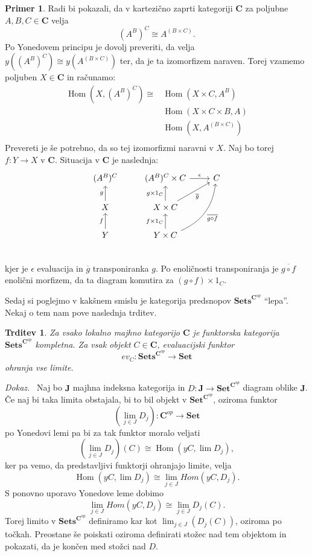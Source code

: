 \documentclass[12pt,a4paper]{book}
\theoremstyle{definition}
\theoremstyle{plain}
\newtheorem{trditev}[definicija]{Trditev}
\newenvironment{dokaz}{\emph{Dokaz.}\ }{\hspace{\fill}{$\Box$}}
\theoremstyle{definition}
\newtheorem{primer}{Primer}[section]
\theoremstyle{remark}
\newcommand{\cat}[1]{\textbf{#1}}
\DeclareMathOperator{\Hom}{Hom}
\newcommand{\predsnop}[1]{\cat{Sets}^{\cat{#1}^{op}}}
\begin{document}
\begin{primer}
Radi bi pokazali, da v kartezično zaprti kategoriji $\cat{C}$ za poljubne $A,B,C \in \cat{C}$ velja 
$$(A^B)^C \cong A^{(B \times C)}.$$
Po Yonedovem principu je dovolj preveriti, da velja $y((A^B)^C) \cong y(A^{(B \times C)})$ ter, da je ta izomorfizem naraven. Torej vzamemo poljuben $X \in \cat{C}$ in računamo:
\begin{align*}
\Hom(X, (A^B)^C) \cong &\Hom(X \times C, A^B) \\
&\Hom(X \times C \times B, A) \\
&\Hom(X, A^{(B \times C)}) \\
\end{align*}
Prevereti je še potrebno, da so tej izomorfizmi naravni v $X$.
Naj bo torej $f : Y \to X$ v $ \cat{C}$. Situacija v $\cat{C}$ je naslednja:
%
\begin{equation}
\begin{tikzcd}
(A^B)^C & (A^B)^C \times C \ar[r, "\epsilon"] & C \\
X \ar[u, "g"] & X \times C \ar[u, "g \times 1_C"] \ar[ur, "\overline{g}"'] & \\
Y \ar[u, "f"] & Y \times C \ar[u, "f \times 1_C"] \ar[uur, bend right, "\overline{g \circ f}"'] & \\
\end{tikzcd}
\end{equation}
kjer je $\epsilon$ evaluacija in $\overline{g}$ transponiranka $g$. Po enoličnosti transponiranja je $\overline{g \circ f}$ enolični morfizem, da ta diagram komutira za $(g \circ f) \times 1_C$.

\end{primer}


Sedaj si poglejmo v kakšnem smislu je kategorija predsnopov $\predsnop{C}$ "`lepa"'. Nekaj o tem nam pove naslednja trditev.

\begin{trditev} \label{trditev 3.3}
Za vsako lokalno majhno kategorijo $\cat{C}$ je funktorska kategorija $\predsnop{C}$ kompletna. Za vsak objekt $C \in \cat{C}$, evaluacijski funktor 
$$ev_C : \predsnop{C} \to \cat{Set}$$
ohranja vse limite.
\end{trditev}
\begin{dokaz}
Naj bo $\cat{J}$ majhna indeksna kategorija in $D : \cat{J} \to \cat{Set}^{\cat{C}^{op}}$ diagram oblike $\cat{J}$. Če naj bi taka limita obstajala, bi to bil objekt v $\cat{Set}^{\cat{C}^{op}}$, oziroma funktor 
$$(\lim_{j \in J} D_j): \cat{C}^{op} \to \cat{Set}$$
po Yonedovi lemi pa bi za tak funktor moralo veljati
$$(\lim_{j \in J} D_j)(C) \cong \Hom(yC, \lim D_j),$$
ker pa vemo, da predstavljivi funktorji ohranjajo limite, velja
$$\Hom(yC, \lim D_j) \cong \lim_{j \in J} Hom(yC, D_j).$$
S ponovno uporavo Yonedove leme dobimo
$$\lim_{j \in J} Hom(yC, D_j) \cong \lim_{j \in J} D_j(C).$$
Torej limito v $\predsnop{C}$ definiramo kar kot $\lim_{j \in J} (D_j(C))$, oziroma po točkah.
%
Preostane še poiskati oziroma definirati stožec nad tem objektom in pokazati, da je končen med stožci nad $D$.


\end{dokaz}
\end{document}

